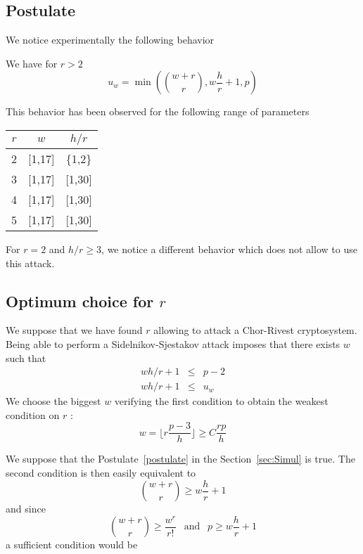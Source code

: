 \documentclass[a4paper]{article}
\begin{document}
\subsection{Postulate}

We notice experimentally the following behavior

\begin{postulate}
\label{postulate}
We have for $r > 2$
$$ u_w = \min \left( \binom{w+r}{r}, w\frac{h}{r} + 1 , p \right)$$
\end{postulate}

This behavior has been observed for the following range of parameters
\begin{center}
\begin{tabular}{|c|c|c|}
\hline
$r$ & $w$ 	& $h/r$ \\
\hline
2	& [1,17]	& \{1,2\}	\\
\hline
3	& [1,17]	& [1,30] \\
\hline
4	& [1,17]	& [1,30] \\
\hline
5	& [1,17]	& [1,30] \\
\hline
\end{tabular}
\end{center}


For $r = 2$ and $h/r \geq 3$, we notice a different behavior which does not allow to use this attack.


\subsection{Optimum choice for $r$}

We suppose that we have found $r$ allowing to attack a Chor-Rivest cryptosystem. Being able to perform a Sidelnikov-Sjestakov attack imposes that there exists $w$ such that
\begin{eqnarray*}
wh/r+1 &\leq & p-2 \\
wh/r+1 &\leq & u_w 
\end{eqnarray*}
We choose the biggest $w$ verifying the first condition to obtain the weakest condition on $r$ : $$ w = \lfloor r \frac{p-3}{h} \rfloor \geq C \frac{rp}{h} $$


We suppose that the Postulate~\ref{postulate} in the Section~\ref{sec:Simul} is true. The second condition is then easily equivalent to
$$ \binom{w+r}{r} \geq w\frac{h}{r}+1 $$
and since
$$ \binom{w+r}{r} \geq \frac{w^r}{r!} \ \ \text{ and } \ \ p \geq w\frac{h}{r}+1 $$
a sufficient condition would be
\end{document}
